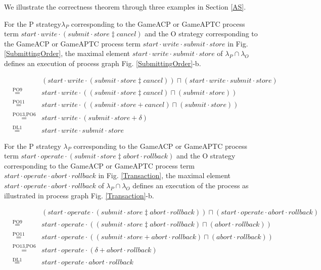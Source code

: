 \documentclass{fac}
\begin{document}
We illustrate the correctness theorem through three examples in Section \ref{AS}.

For the P strategy$\lambda_P$ corresponding to the GameACP or GameAPTC process term $start\cdot write\cdot (submit\cdot store \ddagger cancel)$ and the O strategy corresponding to the GameACP or GameAPTC process term $start\cdot write\cdot submit\cdot store$ in Fig. \ref{SubmittingOrder}, the maximal element $start\cdot write\cdot submit\cdot store$ of $\lambda_P \cap \lambda_O$ defines an execution of  process graph Fig. \ref{SubmittingOrder}-b.

\begin{eqnarray}
&&(start\cdot write\cdot (submit\cdot store \ddagger cancel))\sqcap (start\cdot write\cdot submit\cdot store)\nonumber\\
&\overset{\text{PO9}}{=}&start\cdot write \cdot((submit\cdot store \ddagger cancel)\sqcap(submit\cdot store))\nonumber\\
&\overset{\text{PO11}}{=}&start\cdot write \cdot((submit\cdot store + cancel)\sqcap (submit\cdot store))\nonumber\\
&\overset{\text{PO13,PO6}}{=}&start\cdot write \cdot (submit\cdot store + \delta)\nonumber\\
&\overset{\text{DL1}}{=}&start\cdot write \cdot submit\cdot store\nonumber
\end{eqnarray}

For the P strategy $\lambda_P$ corresponding to the GameACP or GameAPTC process term $start\cdot operate\cdot (submit\cdot store \ddagger abort\cdot rollback)$ and the O strategy corresponding to the GameACP or GameAPTC process term $start\cdot operate\cdot abort\cdot rollback$ in Fig. \ref{Transaction}, the maximal element $start\cdot operate\cdot abort\cdot rollback$ of $\lambda_P \cap \lambda_O$ defines an execution of the process as illustrated in process graph Fig. \ref{Transaction}-b.

\begin{eqnarray}
&&(start\cdot operate\cdot (submit\cdot store \ddagger abort\cdot rollback))\sqcap (start\cdot operate\cdot abort\cdot rollback)\nonumber\\
&\overset{\text{PO9}}{=}&start\cdot operate\cdot((submit\cdot store \ddagger abort\cdot rollback)\sqcap (abort \cdot rollback))\nonumber\\
&\overset{\text{PO11}}{=}&start\cdot operate\cdot((submit\cdot store + abort \cdot rollback)\sqcap (abort \cdot rollback))\nonumber\\
&\overset{\text{PO13,PO6}}{=}&start\cdot operate\cdot(\delta + abort\cdot rollback)\nonumber\\
&\overset{\text{DL1}}{=}&start\cdot operate\cdot abort\cdot rollback\nonumber
\end{eqnarray}
\end{document}
